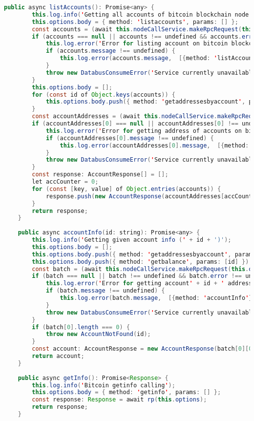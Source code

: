 \begin{lstlisting}[language=java]
	public async listAccounts(): Promise<any> {
		this.log.info('Getting all accounts of bitcoin blockchain node');
		this.options.body = { method: 'listaccounts', params: [] };
		const accounts = (await this.nodeCallService.makeRpcRequest(this.options))[0];
		if (accounts === null || accounts !== undefined && accounts.error !== undefined) {
			this.log.error('Error for listing account on bitcoin blockchain', [{method: 'listAccounts'}]);
			if (accounts.message !== undefined) {
				this.log.error(accounts.message,  [{method: 'listAccounts'}]);
			}
			throw new DatabusConsumeError('Service currently unavailable');
		}
		this.options.body = [];
		for (const id of Object.keys(accounts)) {
			this.options.body.push({ method: 'getaddressesbyaccount', params: [id] });
		}
		const accountAddresses = (await this.nodeCallService.makeRpcRequest(this.options));
		if (accountAddresses[0] === null || accountAddresses[0] !== undefined && accountAddresses[0].error !== undefined) {
			this.log.error('Error for getting address of accounts on bitcoin blockchain', [{method: 'listAccounts'}]);
			if (accountAddresses[0].message !== undefined) {
				this.log.error(accountAddresses[0].message,  [{method: 'listAccounts'}]);
			}
			throw new DatabusConsumeError('Service currently unavailable');
		}
		const response: AccountResponse[] = [];
		let accCounter = 0;
		for (const [key, value] of Object.entries(accounts)) {
			response.push(new AccountResponse(accountAddresses[accCounter++][0], key, value, 'bitcoin'));
		}
		return response;
	}
	
	public async accountInfo(id: string): Promise<any> {
		this.log.info('Getting given account info (' + id + ')');
		this.options.body = [];
		this.options.body.push({ method: 'getaddressesbyaccount', params: [id] });
		this.options.body.push({ method: 'getbalance', params: [id] });
		const batch = (await this.nodeCallService.makeRpcRequest(this.options));
		if (batch === null || batch !== undefined && batch.error !== undefined) {
			this.log.error('Error for getting account' + id + ' addresses on bitcoin', [{method: 'accountInfo'}]);
			if (batch.message !== undefined) {
				this.log.error(batch.message,  [{method: 'accountInfo'}]);
			}
			throw new DatabusConsumeError('Service currently unavailable');
		}
		if (batch[0].length === 0) {
			throw new AccountNotFound(id);
		}
		const account: AccountResponse = new AccountResponse(batch[0][0], id, batch[1], 'bitcoin');
		return account;
	}
	
	public async getInfo(): Promise<Response> {
		this.log.info('Bitcoin getinfo calling');
		this.options.body = { method: 'getinfo', params: [] };
		const response: Response = await rp(this.options);
		return response;
	}
	

\end{lstlisting}
